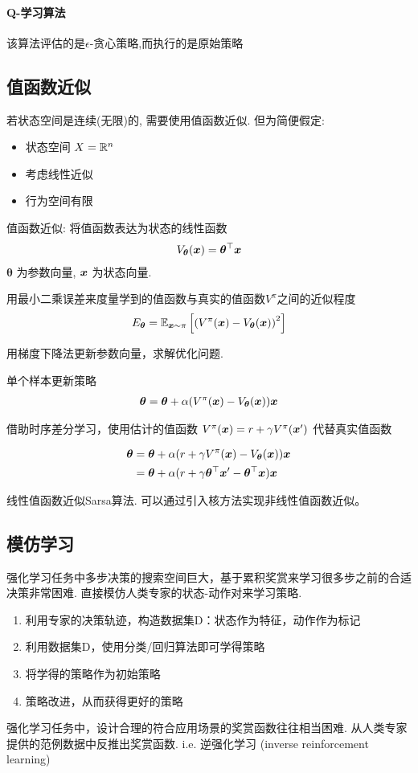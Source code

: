\paragraph{Q-学习算法}该算法评估的是$\epsilon$-贪心策略,而执行的是原始策略

\subsection{值函数近似}
若状态空间是连续(无限)的, 需要使用值函数近似. 但为简便假定:
\begin{itemize}
    \item 状态空间 $X=\mathbb{R}^n$
    \item 考虑线性近似
    \item 行为空间有限
\end{itemize}

值函数近似: 将值函数表达为状态的线性函数
\begin{align*}
    V_{\bm \theta}(\bm{x})=\bm{\theta}^\top \bm{x}
\end{align*}
$\bm{\theta}$ 为参数向量, $\bm{x}$ 为状态向量. 

用最小二乘误差来度量学到的值函数与真实的值函数$V^\pi$之间的近似程度
\begin{align*}
    E_{\bm\theta}=\mathbb{E}_{\bm{x}\sim\pi}\left[ \left( V^\pi(\bm{x})-V_{\bm\theta}(\bm{x}) \right)^2 \right]
\end{align*}

用梯度下降法更新参数向量，求解优化问题.

单个样本更新策略
\begin{align*}
    \bm\theta=\bm\theta+\alpha(V^\pi(\bm{x})-V_{\bm\theta}(\bm{x}) )\bm{x}
\end{align*}

借助时序差分学习，使用估计的值函数 $V^\pi(\bm{x})=r+\gamma V^\pi(\bm{x}')$ 代替真实值函数

\begin{align*}
    \bm\theta&=\bm\theta+\alpha(r+\gamma V^\pi(\bm{x})-V_{\bm\theta}(\bm{x}) )\bm{x}\\
    &=\bm\theta+\alpha(r+\gamma\bm{\theta}^\top\bm{x}'-\bm{\theta}^\top\bm{x} )\bm{x}\\
\end{align*}

线性值函数近似Sarsa算法. 可以通过引入核方法实现非线性值函数近似。

\subsection{模仿学习}
强化学习任务中多步决策的搜索空间巨大，基于累积奖赏来学习很多步之前的合适决策非常困难. 直接模仿人类专家的状态-动作对来学习策略. 

\begin{enumerate}
    \item 利用专家的决策轨迹，构造数据集D：状态作为特征，动作作为标记
    \item 利用数据集D，使用分类/回归算法即可学得策略
    \item 将学得的策略作为初始策略
    \item 策略改进，从而获得更好的策略
\end{enumerate}

强化学习任务中，设计合理的符合应用场景的奖赏函数往往相当困难. 从人类专家提供的范例数据中反推出奖赏函数. i.e. 逆强化学习 (inverse reinforcement learning)